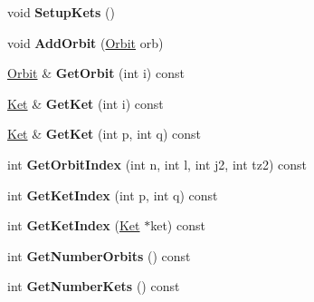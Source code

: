 \begin{DoxyCompactItemize}
\item 
\hypertarget{classModelSpace_ae1a3578ed5aabec2956998a870a4e2d2}{void {\bfseries Setup\-Kets} ()}\label{classModelSpace_ae1a3578ed5aabec2956998a870a4e2d2}

\item 
\hypertarget{classModelSpace_ad8acc2ca5b475862101595d911987a7e}{void {\bfseries Add\-Orbit} (\hyperlink{classOrbit}{Orbit} orb)}\label{classModelSpace_ad8acc2ca5b475862101595d911987a7e}

\item 
\hypertarget{classModelSpace_afe51ff3553478b349eba65c61a19ca3e}{\hyperlink{classOrbit}{Orbit} \& {\bfseries Get\-Orbit} (int i) const }\label{classModelSpace_afe51ff3553478b349eba65c61a19ca3e}

\item 
\hypertarget{classModelSpace_adc36e64fb3bb4dc76819f91e9057844f}{\hyperlink{classKet}{Ket} \& {\bfseries Get\-Ket} (int i) const }\label{classModelSpace_adc36e64fb3bb4dc76819f91e9057844f}

\item 
\hypertarget{classModelSpace_ab3662f5e12ce6da0164c8adbe1abbb95}{\hyperlink{classKet}{Ket} \& {\bfseries Get\-Ket} (int p, int q) const }\label{classModelSpace_ab3662f5e12ce6da0164c8adbe1abbb95}

\item 
\hypertarget{classModelSpace_ab3d8cb8214e082773caa5820773ee16e}{int {\bfseries Get\-Orbit\-Index} (int n, int l, int j2, int tz2) const }\label{classModelSpace_ab3d8cb8214e082773caa5820773ee16e}

\item 
\hypertarget{classModelSpace_ad2622b2d268c55b89a2082189f7185b1}{int {\bfseries Get\-Ket\-Index} (int p, int q) const }\label{classModelSpace_ad2622b2d268c55b89a2082189f7185b1}

\item 
\hypertarget{classModelSpace_ae87e8738f2aed2f23eab933b77a3772f}{int {\bfseries Get\-Ket\-Index} (\hyperlink{classKet}{Ket} $\ast$ket) const }\label{classModelSpace_ae87e8738f2aed2f23eab933b77a3772f}

\item 
\hypertarget{classModelSpace_a48004a4a3d559081827da87c9c4bfe94}{int {\bfseries Get\-Number\-Orbits} () const }\label{classModelSpace_a48004a4a3d559081827da87c9c4bfe94}

\item 
\hypertarget{classModelSpace_a2a46d43beb6d4e2de8c978ff921f4047}{int {\bfseries Get\-Number\-Kets} () const }\label{classModelSpace_a2a46d43beb6d4e2de8c978ff921f4047}


\end{DoxyCompactItemize}
